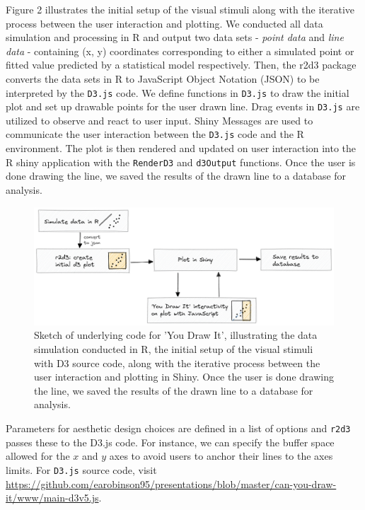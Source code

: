 \documentclass[10pt]{article}
\begin{document}
Figure 2 illustrates the initial setup of the visual stimuli along with
the iterative process between the user interaction and plotting. We
conducted all data simulation and processing in R and output two data
sets - \emph{point data} and \emph{line data} - containing (x, y)
coordinates corresponding to either a simulated point or fitted value
predicted by a statistical model respectively. Then, the r2d3 package
converts the data sets in R to JavaScript Object Notation (JSON) to be
interpreted by the \texttt{D3.js} code. We define functions in
\texttt{D3.js} to draw the initial plot and set up drawable points for
the user drawn line. Drag events in \texttt{D3.js} are utilized to
observe and react to user input. Shiny Messages are used to communicate
the user interaction between the \texttt{D3.js} code and the R
environment. The plot is then rendered and updated on user interaction
into the R shiny application with the \texttt{RenderD3} and
\texttt{d3Output} functions. Once the user is done drawing the line, we
saved the results of the drawn line to a database for analysis.

\begin{figure}[ht]
\begin{center}
\centerline{\includegraphics[width=\columnwidth]{images/code-sketch-2}}
\caption{Sketch of underlying code for 'You Draw It', illustrating the data simulation conducted in R, the initial setup of the visual stimuli with D3 source code, along with the iterative process between the user interaction and plotting in Shiny. Once the user is done drawing the line, we saved the results of the drawn line to a database for analysis.}
\label{you-draw-it-code-sketch}
\end{center}
\end{figure}

Parameters for aesthetic design choices are defined in a list of options
and \texttt{r2d3} passes these to the D3.js code. For instance, we can
specify the buffer space allowed for the \(x\) and \(y\) axes to avoid
users to anchor their lines to the axes limits. For \texttt{D3.js}
source code, visit
\url{https://github.com/earobinson95/presentations/blob/master/can-you-draw-it/www/main-d3v5.js}.
\end{document}
